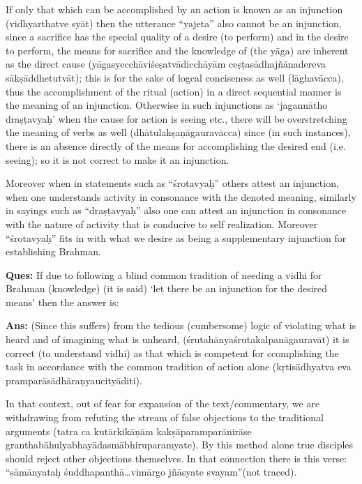 If only that which can be accomplished by an action is known as an injunction (vidhyarthatve syāt) then the utterance “yajeta” also cannot be an injunction, since a sacrifice has the special quality of a desire (to perform) and in the desire to perform, the means for sacrifice and the knowledge of (the yāga) are inherent as the direct cause (yāgasyecchāviśeṣatvādicchāyām ceṣṭasādhajñānadereva sākṣāddhetutvāt);  this is for the sake of logcal conciseness as well (lāghavācca),  thus the accomplishment of the ritual (action) in a direct sequential manner is the meaning of an injunction. Otherwise in such injunctions as ‘jagannātho draṣṭavyaḥ’ when the cause for action is seeing etc., there will be overstretching the meaning of verbs as well (dhātulakṣaṇāgauravācca) since (in such instances), there is an absence directly of the means for accomplishing the desired end (i.e. seeing); so it is not correct to make it an injunction. 

Moreover when in statements such as “śrotavyaḥ” others attest an injunction, when one understands activity in consonance with the denoted meaning, similarly in sayings such as “draṣṭavyaḥ” also one can attest an injunction in consonance with the nature of activity that is conducive to self realization. Moreover “śrotavyaḥ” fits in with what we desire as being a supplementary injunction for establishing Brahman.

\vskip 3pt

\textbf{Ques:} If due to following a blind common tradition of needing a vidhi for Brahman (knowledge) (it is said) ‘let there be an injunction for the desired means’ then the answer is:

\vskip 3pt

\textbf{Ans:} (Since  this suffers) from the tedious (cumbersome) logic of violating what is heard and of imagining what is unheard, (śrutahānyaśrutakalpanāgauravāt) it is correct  (to understand vidhi) as that which is competent for ccomplishing the task in accordance with the common tradition of action alone (kṛtisādhyatva eva pramparāsādhāraṇyaucityāditi). 

\vskip 3pt

In that context, out of fear for expansion of the text/commentary, we are withdrawing from refuting the stream of false objections to the traditional arguments (tatra ca kutārkikāṇām kakṣāparamparānirāse granthabāhulyabhayādasmābhiruparamyate). By this method alone true disciples should reject other objections themselves. In that connection there is this verse: “sāmānyataḥ śuddhapanthā…vimārgo jñāsyate svayam”(not traced).

